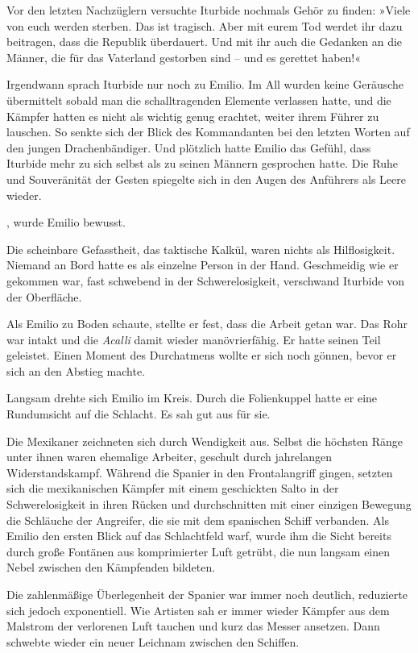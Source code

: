 Vor den letzten Nachzüglern versuchte Iturbide nochmals Gehör zu
finden: »Viele von euch werden sterben. Das ist tragisch. Aber mit
eurem Tod werdet ihr dazu beitragen, dass die Republik überdauert.
Und mit ihr auch die Gedanken an die Männer, die für das Vaterland
gestorben sind – und es gerettet haben!«

Irgendwann sprach Iturbide nur noch zu Emilio. Im All wurden keine
Geräusche übermittelt sobald man die schalltragenden Elemente
verlassen hatte, und die Kämpfer hatten es nicht als wichtig genug
erachtet, weiter ihrem Führer zu lauschen. So senkte sich der Blick
des Kommandanten bei den letzten Worten auf den jungen
Drachenbändiger. Und plötzlich hatte Emilio das Gefühl, dass
Iturbide mehr zu sich selbst als zu seinen Männern gesprochen
hatte. Die Ruhe und Souveränität der Gesten spiegelte sich in den
Augen des Anführers als Leere wieder.

, wurde Emilio bewusst.

Die scheinbare Gefasstheit, das taktische Kalkül, waren nichts als
Hilflosigkeit. Niemand an Bord hatte es als einzelne Person in der
Hand. Geschmeidig wie er gekommen war, fast schwebend in der
Schwerelosigkeit, verschwand Iturbide von der Oberfläche.

Als Emilio zu Boden schaute, stellte er fest, dass die Arbeit getan
war. Das Rohr war intakt und die \textit{Acalli} damit wieder
manövrierfähig. Er hatte seinen Teil geleistet. Einen Moment des
Durchatmens wollte er sich noch gönnen, bevor er sich an den
Abstieg machte.

Langsam drehte sich Emilio im Kreis. Durch die Folienkuppel hatte
er eine Rundumsicht auf die Schlacht. Es sah gut aus für sie.

Die Mexikaner zeichneten sich durch Wendigkeit aus. Selbst die
höchsten Ränge unter ihnen waren ehemalige Arbeiter, geschult durch
jahrelangen Widerstandskampf. Während die Spanier in den
Frontalangriff gingen, setzten sich die mexikanischen Kämpfer mit
einem geschickten Salto in der Schwerelosigkeit in ihren Rücken und
durchschnitten mit einer einzigen Bewegung die Schläuche der
Angreifer, die sie mit dem spanischen Schiff verbanden. Als Emilio
den ersten Blick auf das Schlachtfeld warf, wurde ihm die Sicht
bereits durch große Fontänen aus komprimierter Luft getrübt, die
nun langsam einen Nebel zwischen den Kämpfenden bildeten.

Die zahlenmäßige Überlegenheit der Spanier war immer noch deutlich,
reduzierte sich jedoch exponentiell. Wie Artisten sah er immer
wieder Kämpfer aus dem Malstrom der verlorenen Luft tauchen und
kurz das Messer ansetzen. Dann schwebte wieder ein neuer Leichnam
zwischen den Schiffen.


